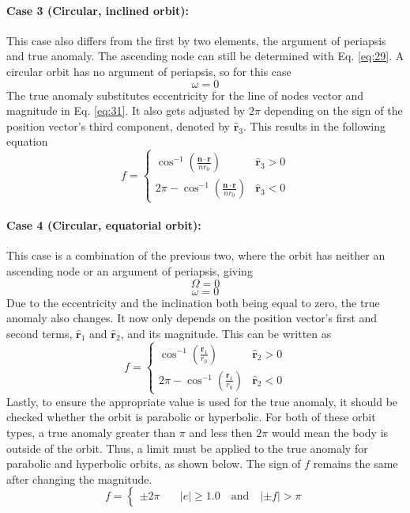 \paragraph{Case 3 (Circular, inclined orbit):}
This case also differs from the first by two elements, the argument of periapsis and true anomaly. The ascending node can still be determined with Eq. \ref{eq:29}. A circular orbit has no argument of periapsis, so for this case
\begin{equation}
\omega = 0
\end{equation}
The true anomaly substitutes eccentricity for the line of nodes vector and magnitude in Eq. \ref{eq:31}. It also gets adjusted by $2\pi$ depending on the sign of the position vector's third component, denoted by $\bm{\hat{r}}_3$. This results in the following equation
\begin{equation}
f=\begin{cases}
\cos^{-1}(\frac{\bm{n} \cdot \bm{r}}{n r_0}) & \bm{\hat{r}}_3 > 0\\
2\pi - \cos^{-1}(\frac{\bm{n} \cdot \bm{r}}{n r_0}) & \bm{\hat{r}}_3 < 0
\end{cases}
\end{equation}
\paragraph{Case 4 (Circular, equatorial orbit):}
This case is a combination of the previous two, where the orbit has neither an ascending node or an argument of periapsis, giving
\begin{equation}
\Omega = 0
\end{equation}
\begin{equation}
\omega = 0
\end{equation}
Due to the eccentricity and the inclination both being equal to zero, the true anomaly also changes. It now only depends on the position vector's first and second terms, $\bm{\hat{r}}_1$ and $\bm{\hat{r}}_2$, and its magnitude. This can be written as
\begin{equation}
f=\begin{cases}
\cos^{-1}(\frac{\bm{r}_1}{r_0}) & \bm{\hat{r}}_2 > 0\\
2\pi - \cos^{-1}(\frac{\bm{r}_1}{r_0}) & \bm{\hat{r}}_2 < 0
\end{cases}
\end{equation}
Lastly, to ensure the appropriate value is used for the true anomaly, it should be checked whether the orbit is parabolic or hyperbolic. For both of these orbit types, a true anomaly greater than $\pi$ and less then $2\pi$ would mean the body is outside of the orbit. Thus, a limit must be applied to the true anomaly for parabolic and hyperbolic orbits, as shown below. The sign of $f$ remains the same after changing the magnitude.
\begin{equation}
f = 
\begin{cases}
\pm 2\pi & \quad |e|\geq 1.0 \quad \textrm{and} \quad |\pm f|>\pi
\end{cases}
\end{equation}

